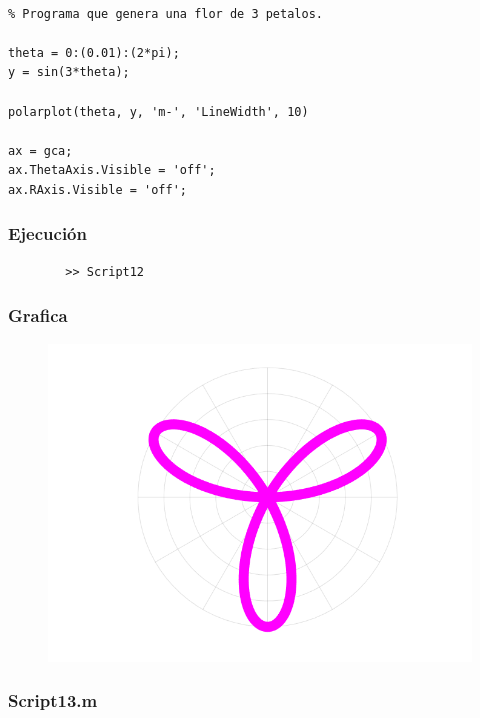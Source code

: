 \documentclass{article}
\begin{document}
	\begin{lstlisting}

% Programa que genera una flor de 3 petalos.

theta = 0:(0.01):(2*pi);
y = sin(3*theta);

polarplot(theta, y, 'm-', 'LineWidth', 10)

ax = gca;
ax.ThetaAxis.Visible = 'off';
ax.RAxis.Visible = 'off';

	\end{lstlisting}

	\subsubsection{Ejecución}
	
	\begin{lstlisting}
		>> Script12
	\end{lstlisting}
	
	\subsubsection{Grafica}
	
	\begin{figure}[h]
		\centering
		\includegraphics[width=\textwidth]{grafica12.png}
	\end{figure}
	
	\newpage
	
	\subsubsection{Script13.m}
	
\end{document}

